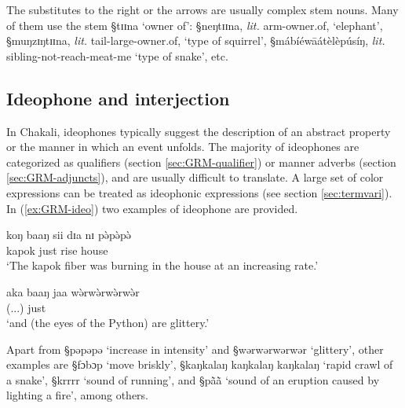 The substitutes to the right or the arrows are usually complex stem nouns. Many
of them use
 the stem {\S tɪɪna} `owner of': {\S neŋtɪɪna}, {\it lit.} arm-owner.of,
`elephant',  {\S muŋzɪŋtɪɪna}, {\it lit.} tail-large-owner.of,  `type of
squirrel', {\S mábíéwāátèlèpúsíŋ},  {\it lit.}
sibling-not-reach-meat-me `type of snake', etc. 



\subsection{Ideophone and interjection}
\label{sec:GRM-onoma}

 In Chakali, ideophones typically suggest the description of an abstract
property
or the manner in which an event unfolds.  The majority of ideophones are
categorized as qualifiers (section \ref{sec:GRM-qualifier}) or manner adverbs
(section \ref{sec:GRM-adjuncts}), and are usually
difficult to translate. A large set of color expressions can be treated as
 ideophonic expressions (see section \ref{sec:termvari}).  In
(\ref{ex:GRM-ideo}) two examples of ideophone are provided.
                                             

\begin{exe}
\ex\label{ex:GRM-ideo}
\begin{xlist}
 \ex\label{ex:GRM-ideo-advm}
\gll koŋ baaŋ sii dɪa nɪ pə̀pə̀pə̀\\
kapok just rise house {\postp} {\advm}\\
  \glt `The kapok fiber was burning in the house at an increasing rate.'

 \ex\label{ex:GRM-ideo-qual}
\gll {} aka baaŋ jaa wə̀rwə̀rwə̀rwə̀r\\
(...) {\conn} just {\ident} {\qual}\\
  \glt `and (the eyes of the Python) are glittery.' 

\end{xlist}
\end{exe}


Apart from {\S pəpəpə} `increase in intensity' and   {\S wərwərwərwər}
`glittery', other
examples are {\S fɔbɔp} `move briskly', {\S kaŋkalaŋ kaŋkalaŋ kaŋkalaŋ} `rapid
crawl of a snake', {\S krrrr} `sound of running', 
 and {\S pã̀ã̀} `sound of an
eruption caused by lighting a fire', among others.

